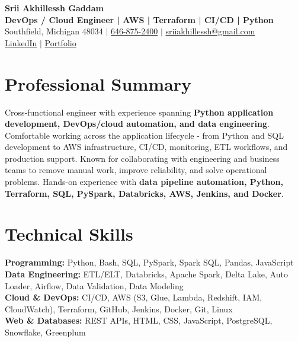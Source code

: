 \documentclass[letterpaper,10pt]{article}
\begin{document}
\fontsize{9.35pt}{10.45pt}\selectfont

\begin{center}
    {\LARGE \textbf{Srii Akhillessh Gaddam}} \\[-1pt]
    \textbf{DevOps / Cloud Engineer | AWS | Terraform | CI/CD | Python} \\[2pt]
    Southfield, Michigan 48034 $|$
    \href{tel:6468752400}{646-875-2400} $|$
    \href{mailto:sriiakhillessh@gmail.com}{sriiakhillessh@gmail.com} \\[1pt]
    \href{https://www.linkedin.com/in/srii-akhiilessh-gaddam-b48668191/}{LinkedIn} $|$
    \href{https://sriiakhillesshg.github.io/portfolio/}{Portfolio}
\end{center}
\vspace{-8pt}

\section{Professional Summary}
\small{Cross-functional engineer with experience spanning \textbf{Python application development, DevOps/cloud automation, and data engineering}. Comfortable working across the application lifecycle - from Python and SQL development to AWS infrastructure, CI/CD, monitoring, ETL workflows, and production support. Known for collaborating with engineering and business teams to remove manual work, improve reliability, and solve operational problems. Hands-on experience with \textbf{data pipeline automation, Python, Terraform, SQL, PySpark, Databricks, AWS, Jenkins, and Docker}.}

\section{Technical Skills}
\small{
\textbf{Programming:} Python, Bash, SQL, PySpark, Spark SQL, Pandas, JavaScript \\
\textbf{Data Engineering:} ETL/ELT, Databricks, Apache Spark, Delta Lake, Auto Loader, Airflow, Data Validation, Data Modeling \\
\textbf{Cloud \& DevOps:} CI/CD, AWS (S3, Glue, Lambda, Redshift, IAM, CloudWatch), Terraform, GitHub, Jenkins, Docker, Git, Linux \\
\textbf{Web \& Databases:} REST APIs, HTML, CSS, JavaScript, PostgreSQL, Snowflake, Greenplum
}
\end{document}
